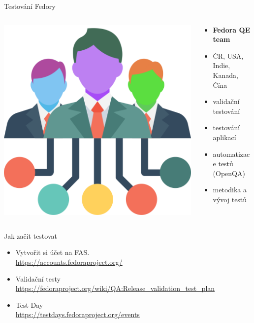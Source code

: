 \documentclass[11pt]{beamer}
\begin{document}
\begin{frame}{Testování Fedory}
	\begin{columns}[T]
	\begin{column}{0.5\textwidth}
			\includegraphics[width=\textwidth]{images/team.png}
	\end{column}
	\begin{column}{0.5\textwidth}
	\begin{itemize}
		\item \textbf{Fedora QE team}
		\item ČR, USA, Indie, Kanada, Čína
		\item validační testování
		\item testování aplikací
		\item automatizace testů (OpenQA)
		\item metodika a vývoj testů
	\end{itemize}
	\end{column}
	\end{columns}
\end{frame}

\begin{frame}{Jak začít testovat}
	\begin{itemize}
		\item Vytvořit si účet na FAS.\\
		\url{https://accounts.fedoraproject.org/}
		\item Validační testy \\ \url{https://fedoraproject.org/wiki/QA:Release_validation_test_plan}
		\item Test Day \\
		\url{https://testdays.fedoraproject.org/events}
	\end{itemize}
\end{frame}
\end{document}
